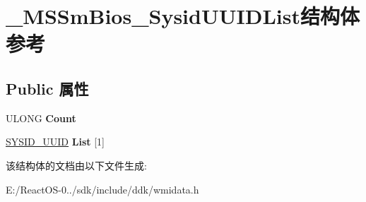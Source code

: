\hypertarget{struct___m_s_sm_bios___sysid_u_u_i_d_list}{}\section{\+\_\+\+M\+S\+Sm\+Bios\+\_\+\+Sysid\+U\+U\+I\+D\+List结构体 参考}
\label{struct___m_s_sm_bios___sysid_u_u_i_d_list}
\subsection*{Public 属性}
\begin{DoxyCompactItemize}
\item 
\mbox{\label{struct___m_s_sm_bios___sysid_u_u_i_d_list_a53a74dc685ba1e078b1ac79f2e2b0de6}} 
U\+L\+O\+NG {\bfseries Count}
\item 
\mbox{\label{struct___m_s_sm_bios___sysid_u_u_i_d_list_ac7fb28de23d54ea1fc5d523c0403f94f}} 
\hyperlink{struct___s_y_s_i_d___u_u_i_d}{S\+Y\+S\+I\+D\+\_\+\+U\+U\+ID} {\bfseries List} \mbox{[}1\mbox{]}
\end{DoxyCompactItemize}


该结构体的文档由以下文件生成\+:\begin{DoxyCompactItemize}
\item 
E\+:/\+React\+O\+S-\/0../sdk/include/ddk/wmidata.\+h\end{DoxyCompactItemize}
